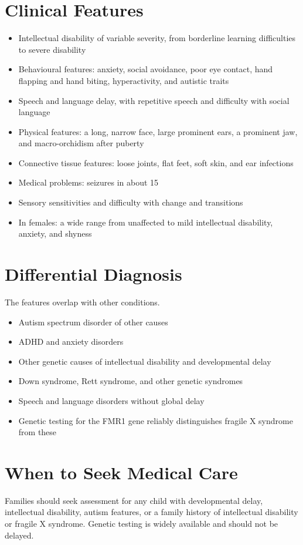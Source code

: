 \section*{Clinical Features}
\begin{itemize}
    \item Intellectual disability of variable severity, from borderline learning difficulties to severe disability
    \item Behavioural features: anxiety, social avoidance, poor eye contact, hand flapping and hand biting, hyperactivity, and autistic traits
    \item Speech and language delay, with repetitive speech and difficulty with social language
    \item Physical features: a long, narrow face, large prominent ears, a prominent jaw, and macro-orchidism after puberty
    \item Connective tissue features: loose joints, flat feet, soft skin, and ear infections
    \item Medical problems: seizures in about 15%
    \item Sensory sensitivities and difficulty with change and transitions
    \item In females: a wide range from unaffected to mild intellectual disability, anxiety, and shyness
\end{itemize}

\section*{Differential Diagnosis}
The features overlap with other conditions.
\begin{itemize}
    \item Autism spectrum disorder of other causes
    \item ADHD and anxiety disorders
    \item Other genetic causes of intellectual disability and developmental delay
    \item Down syndrome, Rett syndrome, and other genetic syndromes
    \item Speech and language disorders without global delay
    \item Genetic testing for the FMR1 gene reliably distinguishes fragile X syndrome from these
\end{itemize}

\section*{When to Seek Medical Care}
Families should seek assessment for any child with developmental delay, intellectual disability, autism features, or a family history of intellectual disability or fragile X syndrome. Genetic testing is widely available and should not be delayed.

